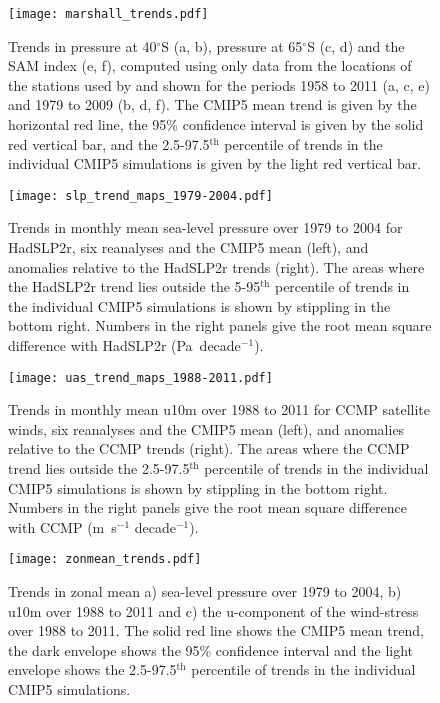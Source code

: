 \documentclass{ametsoc}
\begin{document}
\begin{figure}[t]
  \noindent\texttt{[image: marshall\_trends.pdf]}\\
  \caption{Trends in pressure at 40$^{\circ}$S (a, b), pressure at 65$^{\circ}$S (c, d) and the 
  SAM index (e, f), computed using only data from the locations of the stations used by 
   \cite{Marshall_2003} and shown for the periods 1958 to 2011 (a, c, e) and 1979 to 2009 
  (b, d, f). The CMIP5 mean trend is given by the horizontal red line, the 95\% confidence
   interval is given by the solid red vertical bar, and the 2.5-97.5$^\textrm{th}$ percentile of
    trends in the individual CMIP5 simulations is given by the light red vertical
     bar.}\label{fig:marshall_trends}
\end{figure}

\begin{figure}[t]
  \noindent\texttt{[image: slp\_trend\_maps\_1979-2004.pdf]}\\
  \caption{Trends in monthly mean sea-level pressure over 1979 to 2004 for HadSLP2r, six reanalyses and
   the CMIP5 mean (left), and anomalies relative to the HadSLP2r trends (right). The areas
    where the HadSLP2r trend lies outside the 5-95$^\textrm{th}$ percentile of trends in the
     individual CMIP5 simulations is shown by stippling in the bottom right. Numbers in the 
     right panels give the root mean square difference with
      HadSLP2r (Pa~decade$^{-1}$).}\label{fig:slp_trend_maps_1979-2004}
\end{figure}

\begin{figure}[t]
  \noindent\texttt{[image: uas\_trend\_maps\_1988-2011.pdf]}\\
  \caption{Trends in monthly mean u10m over 1988 to 2011 for CCMP satellite winds, six reanalyses and the 
  CMIP5 mean (left), and anomalies relative to the CCMP trends (right). The areas where the CCMP 
  trend lies outside the 2.5-97.5$^\textrm{th}$ percentile of trends in the individual CMIP5
   simulations is shown by stippling in the bottom right. Numbers in the right panels give
    the root mean square difference with CCMP (m~s$^{-1}$ decade$^{-1}$). }\label{fig:uas_trend_maps_1988-2011}
\end{figure}

\begin{figure}[t]
  \noindent\texttt{[image: zonmean\_trends.pdf]}\\
  \caption{Trends in zonal mean a) sea-level pressure over 1979 to 2004,
  b) u10m over 1988 to 2011 and c) the u-component of the wind-stress over 1988 to 2011. The 
  solid red line shows the CMIP5 mean trend, the dark envelope shows the 95\% confidence
   interval and the light envelope shows the 2.5-97.5$^\textrm{th}$ percentile of trends in 
   the individual 
  CMIP5 simulations.}\label{fig:zonmean_trends}
\end{figure}
\end{document}
